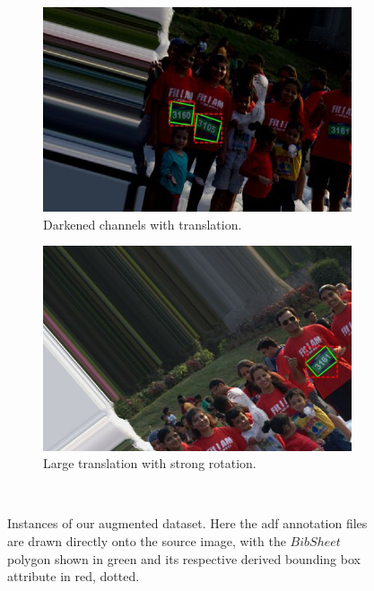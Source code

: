 \begin{figure}[h!]
  \hspace{\fill}
  \begin{subfigure}[b]{0.475\textwidth}
    \includegraphics[width=\textwidth]{images/dataset/augmentation/dark}
    \caption{Darkened channels with translation.}
    \label{fig:dataset:postprocessing:augmentation:crop1}
  \end{subfigure}
  \hspace{\fill}
  \begin{subfigure}[b]{0.475\textwidth}
    \includegraphics[width=\textwidth]{images/dataset/augmentation/large_offset_rot}
    \caption{Large translation with strong rotation.}
    \label{fig:dataset:postprocessing:augmentation:crop2}
  \end{subfigure}
  \hspace{\fill}
  \bigskip
  \\ 
  \caption[Augmented images from our dataset]{Instances of our augmented dataset. Here the \gls{adf} annotation files are drawn directly onto the source image, with the $BibSheet$ polygon shown in green and its respective derived bounding box attribute in red, dotted.}
  \label{fig:dataset:postprocessing:augmentation}
\end{figure}
